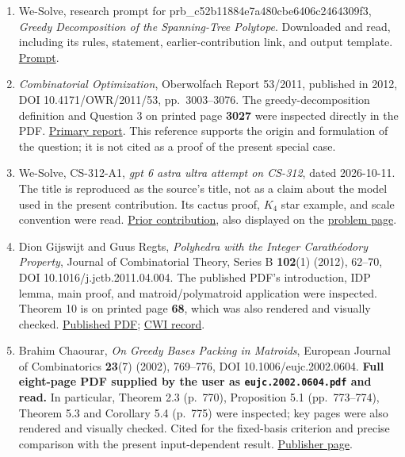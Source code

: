 \documentclass{article}
\begin{document}
\begin{enumerate}
\def\labelenumi{\arabic{enumi}.}
\item
  We-Solve, research prompt for prb_c52b11884e7a480cbe6406c2464309f3, \emph{Greedy Decomposition of the Spanning-Tree Polytope}. Downloaded and read, including its rules, statement, earlier-contribution link, and output template. \href{https://we-solve.github.io/prompts/prb_c52b11884e7a480cbe6406c2464309f3.txt}{Prompt}.
\item
  \emph{Combinatorial Optimization}, Oberwolfach Report 53/2011, published in 2012, DOI 10.4171/OWR/2011/53, pp.~3003--3076. The greedy-decomposition definition and Question 3 on printed page \textbf{3027} were inspected directly in the PDF. \href{https://ems.press/content/serial-article-files/46369}{Primary report}. This reference supports the origin and formulation of the question; it is not cited as a proof of the present special case.
\item
  We-Solve, CS-312-A1, \emph{gpt 6 astra ultra attempt on CS-312}, dated 2026-10-11. The title is reproduced as the source's title, not as a claim about the model used in the present contribution. Its cactus proof, \(K_4\) star example, and scale convention were read. \href{https://we-solve.github.io/contributions/greedy-decomposition-of-the-spanning-tree-polytope/attempt-1/r1/}{Prior contribution}, also displayed on the \href{https://we-solve.github.io/problems/greedy-decomposition-of-the-spanning-tree-polytope/}{problem page}.
\item
  Dion Gijswijt and Guus Regts, \emph{Polyhedra with the Integer Carathéodory Property}, Journal of Combinatorial Theory, Series B \textbf{102}(1) (2012), 62--70, DOI 10.1016/j.jctb.2011.04.004. The published PDF's introduction, IDP lemma, main proof, and matroid/polymatroid application were inspected. Theorem 10 is on printed page \textbf{68}, which was also rendered and visually checked. \href{https://www.math.ucdavis.edu/~deloera/TEACHING/READINGSEMINAR/PAPERS/gijswijt\%2Bregts.pdf}{Published PDF}; \href{https://ir.cwi.nl/pub/18655}{CWI record}.
\item
  Brahim Chaourar, \emph{On Greedy Bases Packing in Matroids}, European Journal of Combinatorics \textbf{23}(7) (2002), 769--776, DOI 10.1006/eujc.2002.0604. \textbf{Full eight-page PDF supplied by the user as \texttt{eujc.2002.0604.pdf} and read.} In particular, Theorem 2.3 (p.~770), Proposition 5.1 (pp.~773--774), Theorem 5.3 and Corollary 5.4 (p.~775) were inspected; key pages were also rendered and visually checked. Cited for the fixed-basis criterion and precise comparison with the present input-dependent result. \href{https://www.sciencedirect.com/science/article/pii/S0195669802906049}{Publisher page}.

\end{enumerate}
\end{document}
